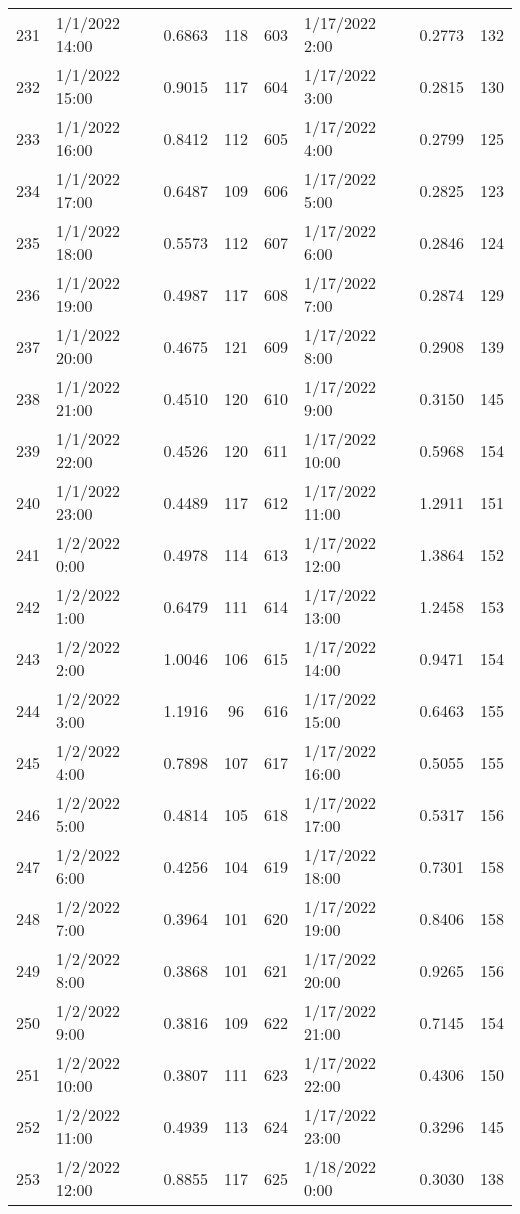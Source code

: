 \begin{center}
\begin{longtable}{llccllcc}
    231&1/1/2022 14:00	   &0.6863&118&603&1/17/2022 2:00	    &0.2773&132 \\
    232&1/1/2022 15:00	   &0.9015&117&604&1/17/2022 3:00	    &0.2815&130 \\
    233&1/1/2022 16:00	   &0.8412&112&605&1/17/2022 4:00	    &0.2799&125 \\
    234&1/1/2022 17:00	   &0.6487&109&606&1/17/2022 5:00	    &0.2825&123 \\
    235&1/1/2022 18:00	   &0.5573&112&607&1/17/2022 6:00	    &0.2846&124 \\
    236&1/1/2022 19:00	   &0.4987&117&608&1/17/2022 7:00	    &0.2874&129 \\
    237&1/1/2022 20:00	   &0.4675&121&609&1/17/2022 8:00	    &0.2908&139 \\
    238&1/1/2022 21:00	   &0.4510&120&610&1/17/2022 9:00	    &0.3150&145 \\
    239&1/1/2022 22:00	   &0.4526&120&611&1/17/2022 10:00	    &0.5968&154 \\
    240&1/1/2022 23:00	   &0.4489&117&612&1/17/2022 11:00	    &1.2911&151 \\
    241&1/2/2022 0:00	   &0.4978&114&613&1/17/2022 12:00	    &1.3864&152 \\
    242&1/2/2022 1:00	   &0.6479&111&614&1/17/2022 13:00	    &1.2458&153 \\
    243&1/2/2022 2:00	   &1.0046&106&615&1/17/2022 14:00	    &0.9471&154 \\
    244&1/2/2022 3:00	   &1.1916&96 &616&1/17/2022 15:00	    &0.6463&155 \\
    245&1/2/2022 4:00	   &0.7898&107&617&1/17/2022 16:00	    &0.5055&155 \\
    246&1/2/2022 5:00	   &0.4814&105&618&1/17/2022 17:00	    &0.5317&156 \\
    247&1/2/2022 6:00	   &0.4256&104&619&1/17/2022 18:00	    &0.7301&158 \\
    248&1/2/2022 7:00	   &0.3964&101&620&1/17/2022 19:00	    &0.8406&158 \\
    249&1/2/2022 8:00	   &0.3868&101&621&1/17/2022 20:00	    &0.9265&156 \\
    250&1/2/2022 9:00	   &0.3816&109&622&1/17/2022 21:00	    &0.7145&154 \\
    251&1/2/2022 10:00	   &0.3807&111&623&1/17/2022 22:00	    &0.4306&150 \\
    252&1/2/2022 11:00	   &0.4939&113&624&1/17/2022 23:00	    &0.3296&145 \\
    253&1/2/2022 12:00	   &0.8855&117&625&1/18/2022 0:00	    &0.3030&138 \\

\end{longtable}
\end{center}
